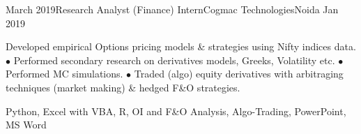 \vspace*{-15px} 
\begin{experiences}
   \experience
    {March 2019}{Research Analyst (Finance) Intern}{Cogmac Technologies}{Noida}
    {Jan 2019}
    {
\begin{description}
    Developed empirical Options pricing models \& strategies using Nifty indices data. $\bullet$ Performed secondary research on derivatives models, Greeks, Volatility etc. $\bullet$ Performed MC simulations. $\bullet$ Traded (algo) equity derivatives with arbitraging techniques (market making) \& hedged F\&O strategies.
    \end{description}
    }
{Python, Excel with VBA, R, OI and F\&O Analysis, Algo-Trading, PowerPoint, MS Word}
\end{experiences}


